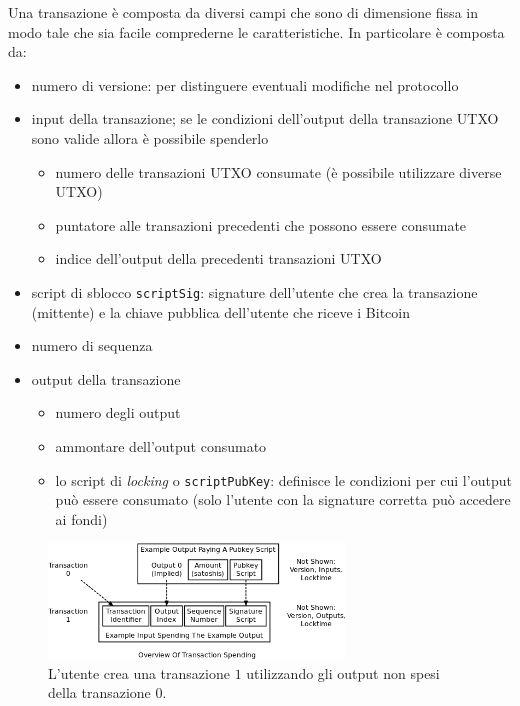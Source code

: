 Una transazione è composta da diversi campi che sono di dimensione fissa in modo tale che sia facile comprederne le caratteristiche. In particolare è composta da:
\begin{itemize}
    \item numero di versione: per distinguere eventuali modifiche nel protocollo
    \item input della transazione; se le condizioni dell'output della transazione UTXO sono valide allora è possibile spenderlo
        \begin{itemize}
            \item numero delle transazioni UTXO consumate (è possibile utilizzare diverse UTXO)
            \item puntatore alle transazioni precedenti che possono essere consumate
            \item indice dell'output della precedenti transazioni UTXO
        \end{itemize}
    \item script di sblocco \texttt{scriptSig}: signature dell'utente che crea la transazione (mittente) e la chiave pubblica dell'utente che riceve i Bitcoin
    \item numero di sequenza
    \item output della transazione
        \begin{itemize}
            \item numero degli output
            \item ammontare dell'output consumato
            \item lo script di \textit{locking} o \texttt{scriptPubKey}: definisce le condizioni per cui l'output può essere consumato (solo l'utente con la signature corretta può accedere ai fondi)
        \end{itemize}
\end{itemize}
\begin{figure}[H]
    \centering
    \includegraphics[width=0.7\textwidth]{./images/example-tx.png}
    \caption{L'utente crea una transazione $1$ utilizzando gli output non spesi della transazione $0$.}
\end{figure}
